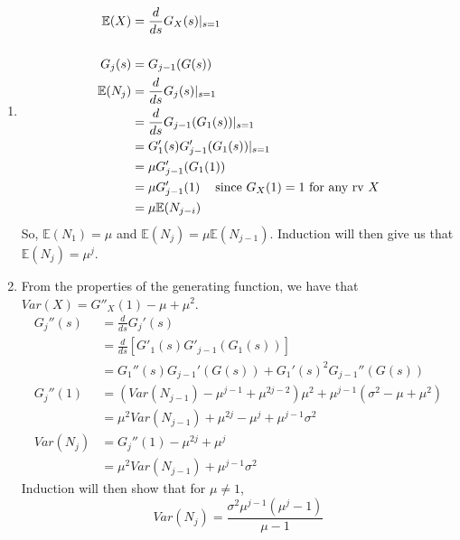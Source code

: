 \documentclass{article}
\begin{document}
\begin{enumerate}
\begin{enumerate}
\begin{enumerate}
\item
\begin{align*}
\mathbb{E}(X) &= \frac{d}{ds}G_X(s)|_{s=1}\\
\\
G_j(s) &= G_{j-1}(G(s))\\
\mathbb{E}(N_j) &= \frac{d}{ds}G_j(s)|_{s=1}\\
&= \frac{d}{ds}G_{j-1}(G_1(s))|_{s=1}\\
&= G_1'(s)G_{j-1}'(G_1(s))|_{s=1}\\
&= \mu G_{j-1}'(G_1(1)) \\
&= \mu G_{j-1}'(1) \mbox{\; \; since $G_X(1)=1$ for any rv $X$} \\
&= \mu \mathbb{E}(N_{j-i})
\end{align*}
So, $\mathbb{E}(N_1) = \mu$ and $\mathbb{E}(N_j) = \mu \mathbb{E}(N_{j-1})$. Induction will then give us that $\mathbb{E}(N_j) = \mu^j$.

\item
From the properties of the generating function, we have that $Var(X) = G''_X(1)-\mu+\mu^2$.
\begin{align*}
G_j''(s) &= \frac{d}{ds} G_j'(s)\\
&= \frac{d}{ds} \left[ G'_1(s)G'_{j-1}(G_1(s))\right]\\
&= G_1''(s)G_{j-1}'(G(s)) + G_1'(s)^2G_{j-1}''(G(s))\\
G_j''(1) &= (Var(N_{j-1})-\mu^{j-1}+\mu^{2j-2})\mu^2+\mu^{j-1}(\sigma^2-\mu+\mu^2)\\
&=\mu^2Var(N_{j-1})+\mu^{2j}-\mu^j+\mu^{j-1}\sigma^2\\
Var(N_j) &= G_j''(1)-\mu^{2j}+\mu^j\\
&= \mu^2Var(N_{j-1})+\mu^{j-1}\sigma^2
\end{align*}
Induction will then show that for $\mu \neq 1$,
$$
Var(N_j) = \frac{\sigma^2\mu^{j-1}(\mu^j-1)}{\mu-1}
$$
\end{enumerate}


\end{enumerate}
\end{enumerate}
\end{document}
